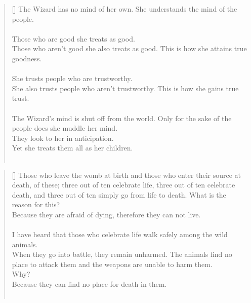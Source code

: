 \documentclass{article}
\begin{document}
\settowidth{\versewidth}{The Wizard leads byemptying people’s minds, filling their bellies, weakening their am- bitions, and making them become strong}
\begin{verse}[\versewidth]
The Wizard has no mind of her own. 
She understands the mind of the people.\\
\hfill\\
Those who are good she treats as good.\\
Those who aren't good she also treats as good. 
This is how she attains true goodness.\\
\hfill\\
She trusts people who are trustworthy.\\
She also trusts people who aren't trustworthy. 
This is how she gains true trust.\\
\hfill\\
The Wizard's mind is shut off from the world. 
Only for the sake of the people does she muddle her mind.\\
They look to her in anticipation.\\
Yet she treats them all as her children.\\
\hfill\\
\end{verse}

\settowidth{\versewidth}{The Wizard leads byemptying people’s minds, filling their bellies, weakening their am- bitions, and making them become strong}
\begin{verse}[\versewidth]
Those who leave the womb at birth and those who enter their source at death, of these; three out of ten celebrate life, three out of ten celebrate death, and three out of ten simply go from life to death. What is the reason for this?\\
Because they are afraid of dying, therefore they can not live.\\
\hfill\\
I have heard that those who celebrate life walk safely among the wild animals.\\
When they go into battle, they remain unharmed. 
The animals find no place to attack them and the weapons are unable to harm them.\\
Why?\\
Because they can find no place for death in them.\\
\hfill\\
\end{verse}
\end{document}
